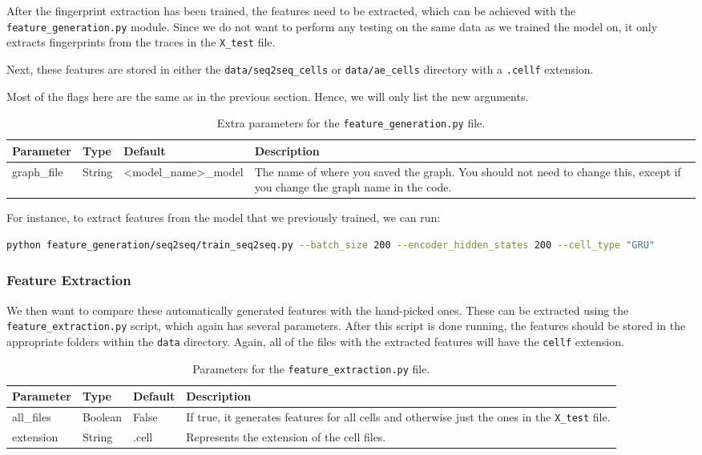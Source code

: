 After the fingerprint extraction has been trained, the features need to be extracted, which can be achieved with the \texttt{feature\_generation.py} module.
Since we do not want to perform any testing on the same data as we trained the model on, it only extracts fingerprints from the traces in the \texttt{X\_test} file.

Next, these features are stored in either the \texttt{data/seq2seq\_cells} or \texttt{data/ae\_cells} directory with a \texttt{.cellf} extension.

Most of the flags here are the same as in the previous section.
Hence, we will only list the new arguments.

\begin{table}[ht]
  \centering
  \begin{tabular}{ l | l | l | p{} }
    \textbf{Parameter} & \textbf{Type} & \textbf{Default} & \textbf{Description} \\ \hline \hline
    graph\_file & String & <model\_name>\_model & The name of where you saved the graph. You should not need to change this, except if you change the graph name in the code.
  \end{tabular}
  \caption{Extra parameters for the \texttt{feature\_generation.py} file.}
\end{table}

\noindent
For instance, to extract features from the model that we previously trained, we can run:
\begin{lstlisting}[language=Bash]
python feature_generation/seq2seq/train_seq2seq.py --batch_size 200 --encoder_hidden_states 200 --cell_type "GRU"
\end{lstlisting}

\subsubsection{Feature Extraction}

We then want to compare these automatically generated features with the hand-picked ones.
These can be extracted using the \texttt{feature\_extraction.py} script, which again has several parameters.
After this script is done running, the features should be stored in the appropriate folders within the \texttt{data} directory.
Again, all of the files with the extracted features will have the \texttt{cellf} extension.

\begin{table}[ht]
  \centering
  \begin{tabular}{ l | l | l | p{} }
    \textbf{Parameter} & \textbf{Type} & \textbf{Default} & \textbf{Description} \\ \hline \hline
    all\_files & Boolean & False & If true, it generates features for all cells and otherwise just the ones in the \texttt{X\_test} file. \\ \hline
    extension & String & .cell & Represents the extension of the cell files.
  \end{tabular}
  \caption{Parameters for the \texttt{feature\_extraction.py} file.}
\end{table}

